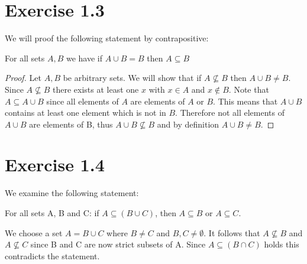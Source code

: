 \documentclass{article} %
\newcommand{\homeworkNumber}{1}
\begin{document}
\section*{Exercise \homeworkNumber.3}
We will proof the following statement by contrapositive:
\begin{center}
	For all sets \( A,B \) we have if \( A \cup B = B \) then \( A \subseteq B \)
\end{center}
\begin{proof}
	Let \( A,B \) be arbitrary sets.
	We will show that if \( A \nsubseteq B  \) then \( A \cup B \neq B \).
	Since \( A \nsubseteq B \) there exists at least one \( x \) with \( x \in A \) and \( x \not\in B \).
	Note that \( A \subseteq A \cup B \) since all elements of \( A \) are elements of \( A \) or \( B \).
	This means that \( A \cup B \) contains at least one element which is not in \( B \).
	Therefore not all elements of \( A \cup B \) are elements of B, thus \( A \cup B \nsubseteq B \)
	and by definition \( A \cup B \neq B \).

\end{proof}



\section*{Exercise \homeworkNumber.4}
We examine the following statement:
\begin{center}
	For all sets A, B and C: if $A \subseteq (B \cup C)$, then $A \subseteq B$ or $A \subseteq C$.
\end{center}
We choose a set $A = B \cup C$ where $B \neq C$ and $B,C \neq \emptyset$. It follows that $A \not\subseteq B$ and $A \not\subseteq C$ since B and C are now strict subsets of A. Since $A \subseteq (B \cap C)$ holds this contradicts the statement.
\end{document}
